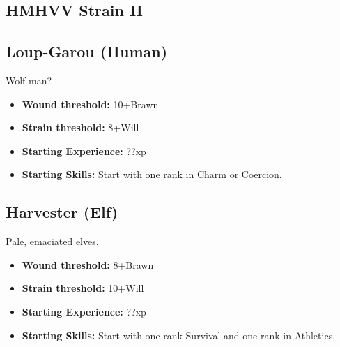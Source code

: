 \documentclass{book}
\begin{document}
\subsection{HMHVV Strain II}
\begin{multicols}{2}
	\subsection{Loup-Garou (Human)}
	Wolf-man?
	
	\begin{itemize}
		\item \textbf{Wound threshold:} 10+Brawn
		\item \textbf{Strain threshold:} 8+Will
		\item \textbf{Starting Experience:} ??xp
		\item \textbf{Starting Skills:} Start with one rank in Charm or Coercion.

	\end{itemize}
	
	\subsection{Harvester (Elf)}
	Pale, emaciated elves.
	
	\begin{itemize}
		\item \textbf{Wound threshold:} 8+Brawn
		\item \textbf{Strain threshold:} 10+Will
		\item \textbf{Starting Experience:} ??xp
		\item \textbf{Starting Skills:} Start with one rank Survival and one rank in Athletics.
	\end{itemize}
	
\end{multicols}
\mbox{ }
%
%	
\end{document}
